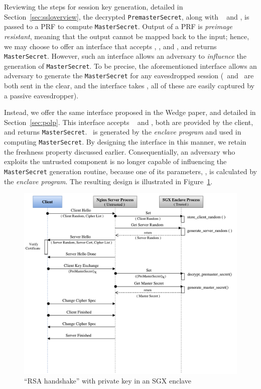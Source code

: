 \documentclass[../../main.tex]{subfiles}
\begin{document}
Reviewing the steps for session key generation, detailed in
Section~\ref{sec:ssloverview}, the decrypted \texttt{PremasterSecret},
along with \crandom~ and \srandom, is passed to a PRF to compute
\texttt{MasterSecret}. Output of a PRF is \textit{preimage resistant},
meaning that the output cannot be mapped back to the input; hence, we
may choose to offer an interface that accepts \crandom, \srandom, and
\premaster, and returns \texttt{MasterSecret}. However, such an
interface allows an adversary to \textit{influence} the generation of
\texttt{MasterSecret}. To be precise, the aforementioned interface
allows an adversary to generate the \texttt{MasterSecret} for any
eavesdropped session (\srandom~and \crandom~are both sent in the
clear, and the interface takes \premaster, all of these are easily
captured by a passive eavesdropper).

Instead, we offer the same interface proposed in the Wedge paper, and
detailed in Section~\ref{sec:polp}. This interface accepts \crandom~
and \premaster, both are provided by the client, and returns
\texttt{MasterSecret}. \srandom~is generated by the \textit{enclave
  program} and used in computing \texttt{MasterSecret}. By designing
the interface in this manner, we retain the freshness property
discussed earlier. Consequentially, an adversary who exploits the
untrusted component is no longer capable of influencing the
\texttt{MasterSecret} generation routine, because one of its
parameters, \srandom, is calculated by the \textit{enclave program}.
The resulting design is illustrated in Figure~\ref{fig:rsa-enc}.

\begin{figure}[H]
  \centering
  \includegraphics[scale=0.35]{images/RSA-SGX-Handshake.pdf}
  \caption[``RSA handshake'' and enclave]{``RSA handshake'' with
    private key in an SGX enclave}
  \label{fig:rsa-enc}
\end{figure}
\end{document}
